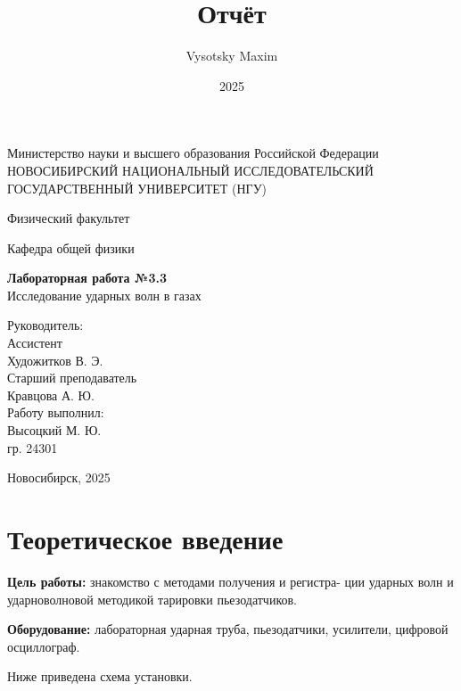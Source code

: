 \documentclass[a4paper,14pt]{article}
\author{Vysotsky Maxim}
\title{Отчёт}
\date{2025}
\begin{document}
	\begin{titlepage}
		\begin{center}
			{Министерство науки и высшего образования Российской Федерации
				НОВОСИБИРСКИЙ НАЦИОНАЛЬНЫЙ ИССЛЕДОВАТЕЛЬСКИЙ
				ГОСУДАРСТВЕННЫЙ УНИВЕРСИТЕТ (НГУ)}
		\end{center}
		\begin{center}
			{Физический факультет}
		\end{center}
		\begin{center}
			{Кафедра общей физики}
		\end{center}
		
		
		\vspace{7cm}
		{
			\begin{center}
				{\bf Лабораторная работа №3.3}\\
			Исследование ударных волн в газах
			\end{center}
		}
		\vspace{2cm}
		\begin{flushright}
			{Руководитель:\\ Ассистент\\
				Художитков В. Э.\\
                Старший преподаватель \\
                Кравцова А. Ю.\\
				Работу выполнил:\\
				Высоцкий М. Ю.\\
				\vspace{0.2cm}
				гр. 24301}
		\end{flushright}
		\vspace{3cm}
		\begin{center}
			Новосибирск, 2025
		\end{center}
	\end{titlepage}

\section{Теоретическое введение}
\hspace{\parindent}\textbf{Цель работы:} знакомство с методами получения и регистра-
ции ударных волн и ударноволновой методикой тарировки пьезодатчиков.

\textbf{Оборудование:} лабораторная ударная труба, пьезодатчики,
усилители, цифровой осциллограф.

Ниже приведена схема установки.
\end{document}
